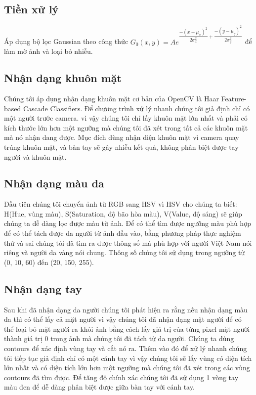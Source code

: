 \documentclass[a4paper, 12pt]{article}
\begin{document}
\subsection{Tiền xử lý}
Áp dụng bộ lọc Gaussian theo công thức $G_{0}(x, y) = A e^{ \dfrac{ -(x - \mu_{x})^{2} }{ 2\sigma^{2}_{x} } + \dfrac{ -(y - \mu_{y})^{2} }{ 2\sigma^{2}_{y} } }$ để làm mờ ảnh và loại bỏ nhiễu.
\subsection{Nhận dạng khuôn mặt }
Chúng tôi áp dụng nhận dạng khuôn mặt cơ bản của OpenCV là Haar Feature-based Cascade Classifiers. Để chương trình xử lý nhanh chúng tôi giả định chỉ có một người trước camera. vì vậy chúng tôi chỉ lấy khuôn mặt lớn nhất và phải có kích thước lớn hơn một ngưỡng mà chúng tôi đã xét trong tất cả các khuôn mặt mà nó nhận dang được.
Mục đích dùng nhận diện khuôn mặt vì camera quay trúng khuôn mặt, và bàn tay sẽ gây nhiễu kết quả, không phân biệt được tay người và khuôn mặt. 
\subsection{Nhận dạng màu da}
Đầu tiên chúng tôi chuyển ảnh từ RGB sang HSV vì HSV cho chúng ta biết: H(Hue, vùng màu), S(Saturation, độ bão hòa màu), V(Value, độ sáng) sẽ giúp chúng ta dễ dàng lọc được màu từ ảnh. Để có thể tìm được ngưỡng màu phù hợp để có thể tách được da người từ ảnh đầu vào, bằng phương pháp thực nghiệm thử và sai chúng tôi đã tìm ra được thông số mà phù hợp với người Việt Nam nói riêng và người da vàng nói chung. Thông số chúng tôi sử dụng trong ngưỡng từ (0, 10, 60) đến (20, 150, 255).
\subsection{Nhận dạng tay}
Sau khi đã nhận dạng da người chúng tôi phát hiện ra rằng nếu nhận dạng màu da thì có thể lấy cả mặt người vì vậy chúng tôi đã nhận dạng mặt người để có thể loại bỏ mặt người ra khỏi ảnh bằng cách lấy giá trị của từng pixel mặt người thành giá trị 0 trong ảnh mà chúng tôi đã tách từ da người. Chúng ta dùng contours để xác định vùng tay và cắt nó ra. Thêm vào đó để xử lý nhanh chúng tôi tiếp tục giả định chỉ có một cánh tay vì vậy chúng tôi sẽ lấy vùng có diện tích lớn nhất và có diện tích lớn hơn một ngưỡng mà chúng tôi đã xét trong các vùng coutours đã tìm được. Để tăng độ chính xác chúng tôi đã sử dụng 1 vòng tay màu đen để dễ dàng phân biệt được giữa bàn tay với cánh tay.
\end{document}

